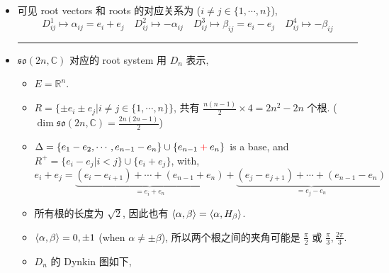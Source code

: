 \begin{itemize}
	\item 可见 root vectors 和 roots 的对应关系为 ($i \neq j \in \{1, \cdots, n\}$),
	\begin{equation}
		D^1_{i j} \mapsto \alpha_{i j} = e_i + e_j \quad D^2_{i j} \mapsto - \alpha_{i j} \quad D^3_{i j} \mapsto \beta_{i j} = e_i - e_j \quad D^4_{i j} \mapsto - \beta_{i j}
	\end{equation}
	
	\noindent\rule[0.5ex]{\linewidth}{0.5pt} %
	
	\item $\mathfrak{so}(2 n, \mathbb{C})$ 对应的 root system 用 $D_n$ 表示,
	\begin{itemize}
		\item $E = \mathbb{R}^n$.
		
		\item $R = \{\pm e_i \pm e_j | i \neq j \in \{1, \cdots, n\}\}$, 共有 $\frac{n (n - 1)}{2} \times 4 = 2 n^2 - 2 n$ 个根. ($\dim \mathfrak{so}(2 n, \mathbb{C}) = \frac{2 n (2 n - 1)}{2}$)
		
		\item $\Delta = \{e_1 - e_2, \cdots, e_{n - 1} - e_n\} \cup \{e_{n - 1} \mathcolor{red}{+} e_n\}$ is a base, and $R^+ = \{e_i - e_j | i < j\} \cup \{e_i + e_j\}$, with,
		\begin{equation}
			e_i + e_j = \underbrace{(e_i - e_{i + 1}) + \cdots + (e_{n - 1} + e_n)}_{= e_i + e_n} + \underbrace{(e_j - e_{j + 1}) + \cdots + (e_{n - 1} - e_n)}_{= e_j - e_n}
		\end{equation}
		
		\item 所有根的长度为 $\sqrt{2}$, 因此也有 $\braket{\alpha, \beta} = \braket{\alpha, H_\beta}$.
		
		\item $\braket{\alpha, \beta} = 0, \pm 1$ (when $\alpha \neq \pm \beta$), 所以两个根之间的夹角可能是 $\frac{\pi}{2}$ 或 $\frac{\pi}{3}, \frac{2 \pi}{3}$.
		
		\item $D_n$ 的 Dynkin 图如下,
		

\end{itemize}
\end{itemize}
